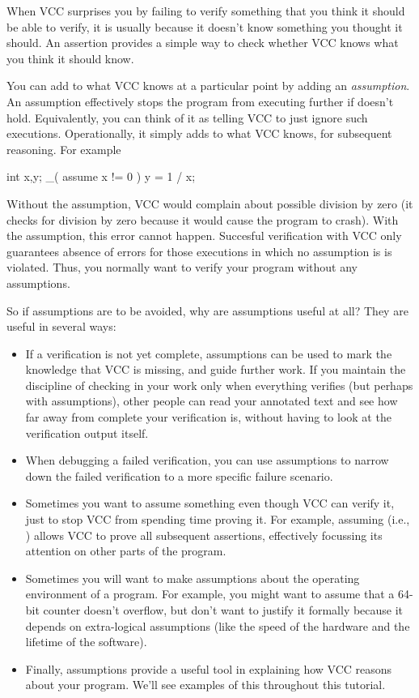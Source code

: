 When VCC surprises you by failing to verify something that you think
it should be able to verify, it is usually because it doesn't know
something you thought it should. An assertion provides a simple way to
check whether VCC knows what you think it should know.

You can add to what VCC knows at a particular point by adding an
\emph{assumption}. An assumption  effectively stops
the program from executing further if  doesn't
hold. Equivalently, you can think of it as telling VCC to just ignore
such executions. Operationally, it simply adds  to what VCC
knows, for subsequent reasoning. For example
\begin{VCC}
  int x,y;
  _( assume x != 0 )
  y = 1 / x;
\end{VCC}

Without the assumption, VCC would complain about possible division by
zero (it checks for division by zero because it would cause the
program to crash).  With the assumption, this error cannot happen.
Succesful verification with VCC only guarantees absence of errors for
those executions in which no assumption is is violated. Thus, you
normally want to verify your program without any assumptions.

So if assumptions are to be avoided, why are assumptions useful at
all? They are useful in several ways:
\begin{itemize}
\item If a verification is not yet complete, assumptions can be used
  to mark the knowledge that VCC is missing, and guide further work.
  If you maintain the discipline of checking in your work only when
  everything verifies (but perhaps with assumptions), other people can
  read your annotated text and see how far away from complete your
  verification is, without having to look at the verification output
  itself.
\item When debugging a failed verification, you can use assumptions to
  narrow down the failed verification to a more specific failure
  scenario.
\item Sometimes you want to assume something even though VCC can
  verify it, just to stop VCC from spending time proving it. For
  example, assuming  (i.e., \vcc{\false}) allows VCC to prove
  all subsequent assertions, effectively focussing its attention on
  other parts of the program.
\item Sometimes you will want to make assumptions about the operating
  environment of a program. For example, you might want to assume that
  a 64-bit counter doesn't overflow, but don't want to justify it
  formally because it depends on extra-logical assumptions (like the
  speed of the hardware and the lifetime of the software). 
\item Finally, assumptions provide a useful tool in explaining how VCC
  reasons about your program. We'll see examples of this throughout
  this tutorial.
\end{itemize}


